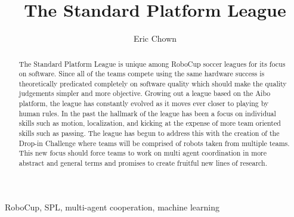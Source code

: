 \documentclass{llncs}
\begin{document}
\title{The Standard Platform League}




\author{ Eric Chown}





\maketitle

\begin{abstract}
The Standard Platform League is unique among RoboCup soccer leagues for
its focus on software. Since all of the teams compete using the same hardware
success is theoretically predicated completely on software quality which should
make the quality judgements simpler and more objective. Growing out a league
based on the Aibo platform, the league has constantly evolved as it moves ever
closer to playing by human rules. In the past the hallmark of the league has been
a focus on individual skills such as motion, localization, and kicking at the expense
of more team oriented skills such as passing. The league has begun to address
this with the creation of the Drop-in Challenge where teams will be comprised
of robots taken from multiple teams. This new focus should force teams to work
on multi agent coordination in more abstract and general terms and promises
to create fruitful new lines of research.
\end{abstract}

\begin{keywords}
RoboCup, SPL, multi-agent cooperation, machine learning
\end{keywords}
\end{document}
